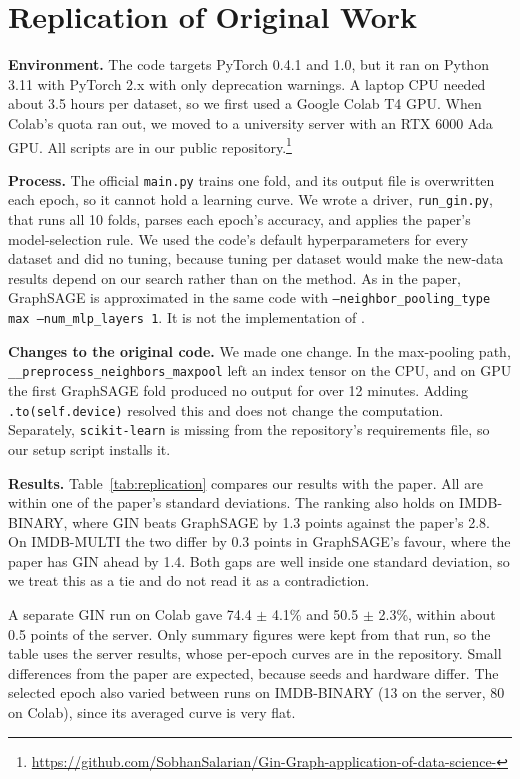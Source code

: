 \documentclass[11pt]{article}
\begin{document}
\section{Replication of Original Work}
\label{sec:replication}

\textbf{Environment.} The code targets PyTorch 0.4.1 and 1.0, but it ran on Python 3.11 with PyTorch 2.x with only deprecation warnings. A laptop CPU needed about 3.5 hours per dataset, so we first used a Google Colab T4 GPU. When Colab's quota ran out, we moved to a university server with an RTX 6000 Ada GPU. All scripts are in our public repository.\footnote{\url{https://github.com/SobhanSalarian/Gin-Graph-application-of-data-science-}}

\textbf{Process.} The official \texttt{main.py} trains one fold, and its output file is overwritten each epoch, so it cannot hold a learning curve. We wrote a driver, \texttt{run\_gin.py}, that runs all 10 folds, parses each epoch's accuracy, and applies the paper's model-selection rule. We used the code's default hyperparameters for every dataset and did no tuning, because tuning per dataset would make the new-data results depend on our search rather than on the method. As in the paper, GraphSAGE is approximated in the same code with \texttt{--neighbor\_pooling\_type max --num\_mlp\_layers 1}. It is not the implementation of \citet{hamilton2017graphsage}.

\textbf{Changes to the original code.} We made one change. In the max-pooling path, \texttt{\_\_preprocess\_neighbors\_maxpool} left an index tensor on the CPU, and on GPU the first GraphSAGE fold produced no output for over 12 minutes. Adding \texttt{.to(self.device)} resolved this and does not change the computation. Separately, \texttt{scikit-learn} is missing from the repository's requirements file, so our setup script installs it.

\textbf{Results.} Table~\ref{tab:replication} compares our results with the paper. All are within one of the paper's standard deviations. The ranking also holds on IMDB-BINARY, where GIN beats GraphSAGE by 1.3 points against the paper's 2.8. On IMDB-MULTI the two differ by 0.3 points in GraphSAGE's favour, where the paper has GIN ahead by 1.4. Both gaps are well inside one standard deviation, so we treat this as a tie and do not read it as a contradiction.

A separate GIN run on Colab gave 74.4 $\pm$ 4.1\% and 50.5 $\pm$ 2.3\%, within about 0.5 points of the server. Only summary figures were kept from that run, so the table uses the server results, whose per-epoch curves are in the repository. Small differences from the paper are expected, because seeds and hardware differ. The selected epoch also varied between runs on IMDB-BINARY (13 on the server, 80 on Colab), since its averaged curve is very flat.
\end{document}
